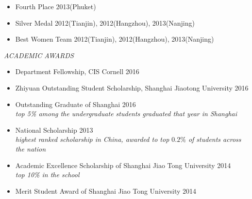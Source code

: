 \documentclass[margin, 10pt]{res} %
\begin{document}
\begin{resume}
\begin{itemize} \itemsep -2pt %
\item Fourth Place \hfill 2013(Phuket)
\item Silver Medal \hfill 2012(Tianjin), 2012(Hangzhou), 2013(Nanjing) 
\item Best Women Team \hfill 2012(Tianjin), 2012(Hangzhou), 2013(Nanjing) 
\end{itemize}
 
{\sl ACADEMIC AWARDS}\\
\begin{itemize}
\item Department Fellowship, CIS Cornell \hfill 2016
\item Zhiyuan Outstanding Student Scholarship, Shanghai Jiaotong University \hfill 2016
\item Outstanding Graduate of Shanghai \hfill 2016\\
\emph{top 5\% among the undergraduate students graduated that year in Shanghai}
\item National Scholarship \hfill 2013 \\ 
\emph{highest ranked scholarship in China, awarded to top $0.2\%$ of students across
the nation}
\item Academic Excellence Scholarship of Shanghai Jiao Tong
  University \hfill 2014 \\
  \emph{top 10\% in the school}
\item Merit Student Award of Shanghai Jiao Tong University \hfill 2014
\end{itemize}




\end{resume}
\end{document}
